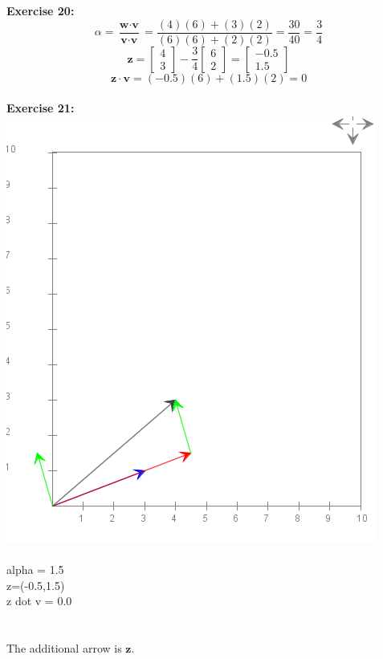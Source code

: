 \documentclass[10pt]{article}
\begin{document}
	\textbf{\large Exercise 20:}\\
	$$ \alpha = \frac{\textbf{w} \cdot \textbf{v}}{\textbf{v} \cdot \textbf{v}} = \frac{(4)(6) + (3)(2)}{(6)(6) + (2)(2)} = \frac{30}{40} = \frac{3}{4}$$
	$$ \textbf{z} = \begin{bmatrix}4 \\ 3\end{bmatrix} - \frac{3}{4}\begin{bmatrix}6 \\ 2\end{bmatrix} = \begin{bmatrix}-0.5 \\ 1.5\end{bmatrix}$$
	$$ \textbf{z} \cdot \textbf{v} = (-0.5)(6) + (1.5)(2) = 0$$
	\\
	
	\textbf{\large Exercise 21:}\\
	\includegraphics[scale=.5]{module7_exercise21}
	\\\\
	alpha = 1.5\\
	z=(-0.5,1.5)\\
	z dot v = 0.0\\
	\\\\
	The additional arrow is $\textbf{z}$.
	\\
	
\end{document}
